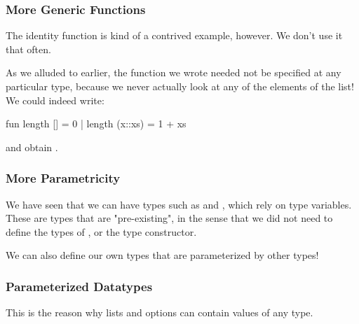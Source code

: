 \documentclass[aspectratio=169]{beamer}
\begin{document}
\begin{frame}[fragile]
  \frametitle{More Generic Functions}

  The identity function is kind of a contrived example, however. We don't use it that
  often.\footnotemark

  As we alluded to earlier, the  function we wrote needed not be specified
  at any particular type, because we never actually look at any of the elements of
  the list! We could indeed write: 

  \begin{codeblock}
    fun length [] = 0
      | length (x::xs) = 1 + xs
  \end{codeblock}

  and obtain .

\end{frame}


\begin{frame}[fragile]
  \frametitle{More Parametricity}

  We have seen that we can have types such as  and 
  , which rely on type variables. These are types that
  are "pre-existing", in the sense that we did not need to define the types
  of , or the \code{->} type constructor.
  
  We can also define our own types that are parameterized by other types!
\end{frame}

\begin{frame}[fragile]
  \frametitle{Parameterized Datatypes}



  This is the reason why lists and options can contain values of any 
  type. 
\end{frame}
\end{document}
